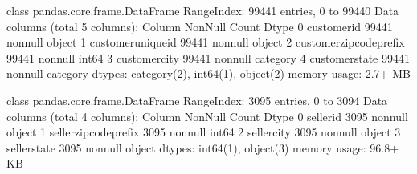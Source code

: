\documentclass[letterpaper,10pt,english]{jupyterBook}
\begin{document}
\begin{sphinxVerbatim}[commandchars=\\\{\}]
\PYGZlt{}class \PYGZsq{}pandas.core.frame.DataFrame\PYGZsq{}\PYGZgt{}
RangeIndex: 99441 entries, 0 to 99440
Data columns (total 5 columns):
 \PYGZsh{}   Column                    Non\PYGZhy{}Null Count  Dtype   
\PYGZhy{}\PYGZhy{}\PYGZhy{}  \PYGZhy{}\PYGZhy{}\PYGZhy{}\PYGZhy{}\PYGZhy{}\PYGZhy{}                    \PYGZhy{}\PYGZhy{}\PYGZhy{}\PYGZhy{}\PYGZhy{}\PYGZhy{}\PYGZhy{}\PYGZhy{}\PYGZhy{}\PYGZhy{}\PYGZhy{}\PYGZhy{}\PYGZhy{}\PYGZhy{}  \PYGZhy{}\PYGZhy{}\PYGZhy{}\PYGZhy{}\PYGZhy{}   
 0   customer\PYGZus{}id               99441 non\PYGZhy{}null  object  
 1   customer\PYGZus{}unique\PYGZus{}id        99441 non\PYGZhy{}null  object  
 2   customer\PYGZus{}zip\PYGZus{}code\PYGZus{}prefix  99441 non\PYGZhy{}null  int64   
 3   customer\PYGZus{}city             99441 non\PYGZhy{}null  category
 4   customer\PYGZus{}state            99441 non\PYGZhy{}null  category
dtypes: category(2), int64(1), object(2)
memory usage: 2.7+ MB
\end{sphinxVerbatim}

\begin{sphinxVerbatim}[commandchars=\\\{\}]
\end{sphinxVerbatim}

\begin{sphinxVerbatim}[commandchars=\\\{\}]
\PYGZlt{}class \PYGZsq{}pandas.core.frame.DataFrame\PYGZsq{}\PYGZgt{}
RangeIndex: 3095 entries, 0 to 3094
Data columns (total 4 columns):
 \PYGZsh{}   Column                  Non\PYGZhy{}Null Count  Dtype 
\PYGZhy{}\PYGZhy{}\PYGZhy{}  \PYGZhy{}\PYGZhy{}\PYGZhy{}\PYGZhy{}\PYGZhy{}\PYGZhy{}                  \PYGZhy{}\PYGZhy{}\PYGZhy{}\PYGZhy{}\PYGZhy{}\PYGZhy{}\PYGZhy{}\PYGZhy{}\PYGZhy{}\PYGZhy{}\PYGZhy{}\PYGZhy{}\PYGZhy{}\PYGZhy{}  \PYGZhy{}\PYGZhy{}\PYGZhy{}\PYGZhy{}\PYGZhy{} 
 0   seller\PYGZus{}id               3095 non\PYGZhy{}null   object
 1   seller\PYGZus{}zip\PYGZus{}code\PYGZus{}prefix  3095 non\PYGZhy{}null   int64 
 2   seller\PYGZus{}city             3095 non\PYGZhy{}null   object
 3   seller\PYGZus{}state            3095 non\PYGZhy{}null   object
dtypes: int64(1), object(3)
memory usage: 96.8+ KB
\end{sphinxVerbatim}
\end{document}
